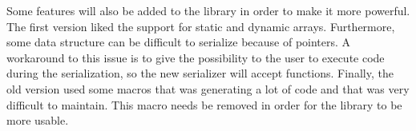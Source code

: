Some features will also be added to the library in order to make it more
powerful. The first version liked the support for static and dynamic arrays.
Furthermore, some data structure can be difficult to serialize because of
pointers. A workaround to this issue is to give the possibility to the user to
execute code during the serialization, so the new serializer will accept
functions. Finally, the old version used some macros that was generating a lot
of code and that was very difficult to maintain. This macro needs be removed in
order for the library to be more usable.
